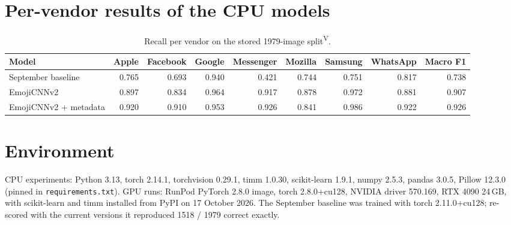\documentclass[11pt,a4paper]{article}
\newcommand{\ver}{\textsuperscript{\textcolor{verified}{\sffamily\scriptsize V}}}
\newcommand{\code}[1]{\texttt{#1}}
\begin{document}


\section{Per-vendor results of the CPU models}
\label{app:extra}
\begin{table}[H]
\centering\small
\caption{Recall per vendor on the stored \num{1979}-image split\ver.}
\footnotesize\setlength{\tabcolsep}{4pt}
\begin{tabular}{@{}lrrrrrrrr@{}}
\toprule
Model & Apple & Facebook & Google & Messenger & Mozilla & Samsung & WhatsApp & Macro F1\\
\midrule
September baseline & 0.765 & 0.693 & 0.940 & 0.421 & 0.744 & 0.751 & 0.817 & 0.738\\
EmojiCNNv2 & 0.897 & 0.834 & 0.964 & 0.917 & 0.878 & 0.972 & 0.881 & 0.907\\
EmojiCNNv2 + metadata & 0.920 & 0.910 & 0.953 & 0.926 & 0.841 & 0.986 & 0.922 & 0.926\\
\bottomrule
\end{tabular}
\end{table}

\section{Environment}
\label{app:env}
CPU experiments: Python 3.13, torch 2.14.1, torchvision 0.29.1, timm 1.0.30, scikit-learn 1.9.1, numpy 2.5.3, pandas 3.0.5, Pillow 12.3.0 (pinned in \code{requirements.txt}). GPU runs: RunPod PyTorch 2.8.0 image, torch 2.8.0+cu128, NVIDIA driver 570.169, RTX 4090 24\,GB, with scikit-learn and timm installed from PyPI on 17 October 2026. The September baseline was trained with torch 2.11.0+cu128; re-scored with the current versions it reproduced \num{1518} / \num{1979} correct exactly.
\end{document}

